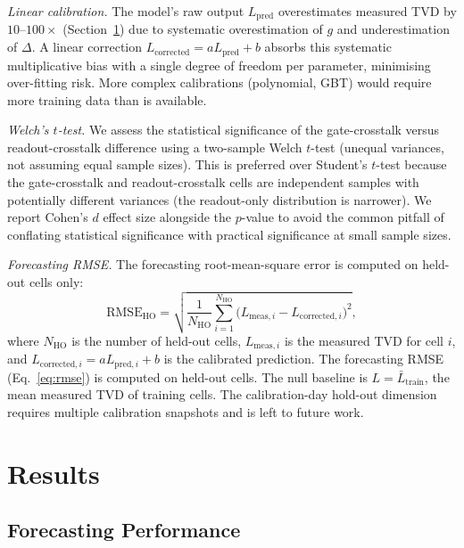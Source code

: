 \documentclass[ASNA,twocolumn]{USG}
\providecommand{\DIFaddtex}[1]{{\protect\color{blue}\uwave{#1}}} %
\providecommand{\DIFaddbegin}{} %
\providecommand{\DIFaddend}{} %
\providecommand{\DIFadd}[1]{\texorpdfstring{\DIFaddtex{#1}}{#1}} %
\begin{document}
\textit{Linear calibration.} The model's raw output $L_{\mathrm{pred}}$ overestimates measured TVD by $10$--$100\times$ (Section~\ref{sec:results}) due to systematic overestimation of $g$ and underestimation of $\Delta$. A linear correction $L_{\mathrm{corrected}} = a L_{\mathrm{pred}} + b$ absorbs this systematic multiplicative bias with a single degree of freedom per parameter, minimising over-fitting risk. More complex calibrations (polynomial, GBT) would require more training data than is available.

\textit{Welch's $t$-test.} We assess the statistical significance of the gate-crosstalk versus readout-crosstalk difference using a two-sample Welch $t$-test (unequal variances, not assuming equal sample sizes). This is preferred over Student's $t$-test because the gate-crosstalk and readout-crosstalk cells are independent samples with potentially different variances (the readout-only distribution is narrower). We report Cohen's $d$ effect size alongside the $p$-value to avoid the common pitfall of conflating statistical significance with practical significance at small sample sizes.

\textit{Forecasting RMSE.} The forecasting root-mean-square error \DIFaddbegin \DIFadd{(RMSE) }\DIFaddend is computed on held-out cells only:
\begin{equation}
    \mathrm{RMSE}_{\mathrm{HO}} = \sqrt{\frac{1}{N_{\mathrm{HO}}} \sum_{i=1}^{N_{\mathrm{HO}}} \bigl(L_{\mathrm{meas},i} - L_{\mathrm{corrected},i}\bigr)^2},
\label{eq:rmse}
\end{equation}
where $N_{\mathrm{HO}}$ is the number of held-out cells, $L_{\mathrm{meas},i}$ is the measured TVD for cell $i$, and $L_{\mathrm{corrected},i} = a L_{\mathrm{pred},i} + b$ is the calibrated prediction. The forecasting RMSE (Eq.~\ref{eq:rmse}) is computed on held-out cells. The null baseline is $L = \bar{L}_{\mathrm{train}}$, the mean measured TVD of training cells. The calibration-day hold-out dimension requires multiple calibration snapshots and is left to future work.

\section{Results}
\label{sec:results}

\subsection{Forecasting Performance}
\end{document}
